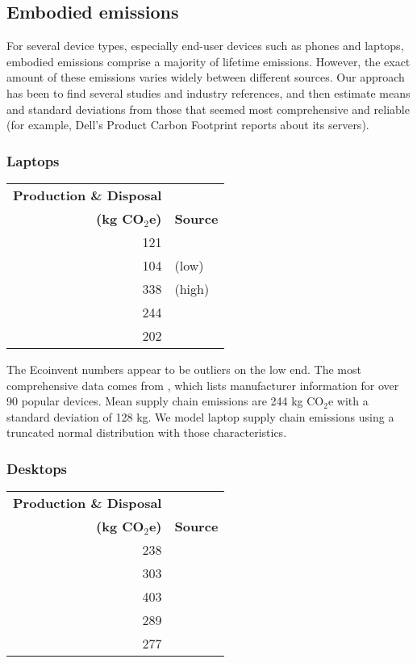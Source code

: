 \documentclass[11pt]{article}
\newcommand{\assumption}[1]{{#1}}
\begin{document}
\subsection{Embodied emissions}

For several device types, especially end-user devices such as phones and laptops, embodied emissions
comprise a majority of lifetime emissions. However, the exact amount of these emissions varies
widely between different sources. Our approach has been to find several studies and industry references,
and then estimate means and standard deviations from those that seemed most comprehensive and reliable
(for example, Dell's Product Carbon Footprint reports about its servers).

\subsubsection{Laptops}

\begin{center}
\begin{tabular}{|r|l|}
\hline
\textbf{Production \& Disposal} & \\
\textbf{(kg CO$_2$e)} & \textbf{Source} \\ \hline
121 & \textcite{ecoinvent}  \\ \hline
104 & \textcite{teehan2013} (low) \\ \hline
338 & \textcite{teehan2013} (high) \\ \hline
244 & \textcite{rarecoil} \\ \hline
202 & \textcite{unctadder2024} \\ \hline
\end{tabular}
\label{tab:embodied_emissions:laptops}
\end{center}

The Ecoinvent numbers appear to be outliers on the low end.
The most comprehensive data comes from \textcite{rarecoil}, which lists manufacturer
information for over 90 popular devices. Mean supply chain emissions are
244 kg CO$_2$e with a standard deviation of 128 kg.
\assumption{We model laptop supply chain emissions using a truncated normal distribution with those characteristics.}

\subsubsection{Desktops}

\begin{center}
\begin{tabular}{|r|l|}
\hline
\textbf{Production \& Disposal} & \\
\textbf{(kg CO$_2$e)} & \textbf{Source} \\ \hline
238 & \textcite{ecoinvent} \\ \hline
303 & \textcite{teehan2013} \\ \hline
403 & \textcite{unctadder2024} \\ \hline
289 & \textcite{dellpcf} \\ \hline
277 & \textcite{boavizta} \\ \hline
\end{tabular}
\label{tab:embodied_emissions:desktops}
\end{center}
\end{document}
